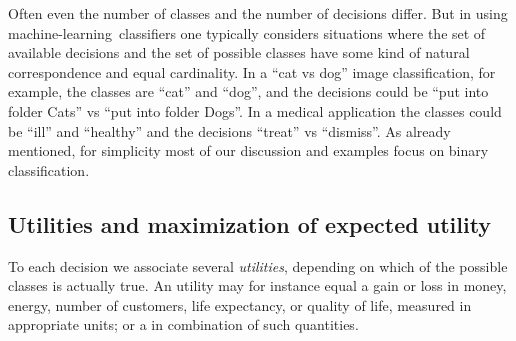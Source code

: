\documentclass[\ifafour a4paper,12pt,\else a5paper,10pt,\fi%
onecolumn,oneside,article,%
british%
]{memoir}
\theoremstyle{remark}
\theoremstyle{innote}
\renewcommand*{\|}[1][]{\nonscript\:#1\vert\nonscript\:\mathopen{}}
\newcommand*{\ml}{machine-learning}
\begin{document}
Often even the number of classes and the number of decisions differ. But in using \ml\ classifiers one typically considers situations where the set of available decisions and the set of possible classes have some kind of natural correspondence and equal cardinality. In a \enquote{cat vs dog} image classification, for example, the classes are \enquote{cat} and \enquote{dog}, and the decisions could be \enquote{put into folder Cats} vs \enquote{put into folder Dogs}. In a medical application the classes could be \enquote{ill} and \enquote{healthy} and the decisions \enquote{treat} vs \enquote{dismiss}. As already mentioned, for simplicity most of our discussion and examples focus on binary classification.


\subsection{Utilities and maximization of expected utility}
\label{sec:dt_utilities}

To each decision we associate several \emph{utilities}, depending on which of the possible classes is actually true. An utility may for instance equal a gain or loss in money, energy, number of customers, life expectancy, or quality of life, measured in appropriate units; or a in combination of such quantities.
\end{document}
